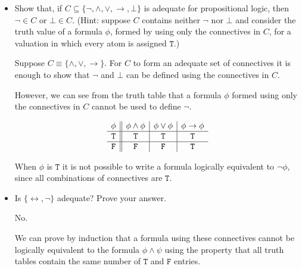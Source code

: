 \documentclass[12pt,leqno]{article}
\newcommand{\T}{\mathtt{T}}
\newcommand{\F}{\mathtt{F}}
\begin{document}
\begin{itemize}

\item[(b)] Show that, if $C \subseteq \{\lnot, \land, \lor, \to, \bot\}$ is
adequate for propositional logic, then $\lnot \in C$ or $\bot \in C$. (Hint:
suppose $C$ contains neither $\lnot$ nor $\bot$ and consider the truth value
of a formula $\phi$, formed by using only the connectives in $C$, for a
valuation in which every atom is assigned $\T$.)

\medskip
Suppose $C \equiv \{\land, \lor, \to\}$. For $C$ to form an adequate set of
connectives it is enough to show that $\lnot$ and $\bot$ can be defined using
the connectives in $C$.

However, we can see from the truth table that a formula $\phi$ formed using
only the connectives in $C$ cannot be used to define $\lnot$.

\[
\begin{array}{ c || c | c | c }
  \phi & \phi \land \phi & \phi \lor \phi & \phi \to \phi \\
\hline
  \T & \T & \T & \T \\
\hline
  \F & \F & \F & \T \\
\end{array}
\]
\medskip

When $\phi$ is $\T$ it is not possible to write a formula logically equivalent
to $\lnot \phi$, since all combinations of connectives are $\T$.

\newpage
\item[(c)] Is $\{\leftrightarrow, \lnot\}$ adequate? Prove your answer.

\medskip
No.

We can prove by induction that a formula using these connectives cannot be
logically equivalent to the formula $\phi \land \psi$ using the property that
all truth tables contain the same number of $\T$ and $\F$ entries.


\end{itemize}
\end{document}
